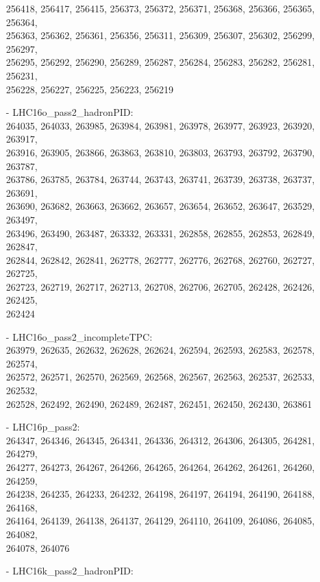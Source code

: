 \begin{appendix}
\begin{itemize}
     256418, 256417, 256415, 256373, 256372, 256371, 256368, 256366, 256365, 256364,\\
     256363, 256362, 256361, 256356, 256311, 256309, 256307, 256302, 256299, 256297,\\
     256295, 256292, 256290, 256289, 256287, 256284, 256283, 256282, 256281, 256231,\\
     256228, 256227, 256225, 256223, 256219
    \item[-] LHC16o\_pass2\_hadronPID:\\[1pt]
     264035, 264033, 263985, 263984, 263981, 263978, 263977, 263923, 263920, 263917,\\
     263916, 263905, 263866, 263863, 263810, 263803, 263793, 263792, 263790, 263787,\\
     263786, 263785, 263784, 263744, 263743, 263741, 263739, 263738, 263737, 263691,\\
     263690, 263682, 263663, 263662, 263657, 263654, 263652, 263647, 263529, 263497,\\
     263496, 263490, 263487, 263332, 263331, 262858, 262855, 262853, 262849, 262847,\\
     262844, 262842, 262841, 262778, 262777, 262776, 262768, 262760, 262727, 262725,\\
     262723, 262719, 262717, 262713, 262708, 262706, 262705, 262428, 262426, 262425,\\
     262424
    \item[-] LHC16o\_pass2\_incompleteTPC:\\[1pt]
     263979, 262635, 262632, 262628, 262624, 262594, 262593, 262583, 262578, 262574,\\
     262572, 262571, 262570, 262569, 262568, 262567, 262563, 262537, 262533, 262532,\\
     262528, 262492, 262490, 262489, 262487, 262451, 262450, 262430, 263861
    \item[-] LHC16p\_pass2:\\[1pt]
     264347, 264346, 264345, 264341, 264336, 264312, 264306, 264305, 264281, 264279,\\
     264277, 264273, 264267, 264266, 264265, 264264, 264262, 264261, 264260, 264259,\\
     264238, 264235, 264233, 264232, 264198, 264197, 264194, 264190, 264188, 264168,\\
     264164, 264139, 264138, 264137, 264129, 264110, 264109, 264086, 264085, 264082,\\
     264078, 264076
    \item[-] LHC16k\_pass2\_hadronPID:\\[1pt]

\end{itemize}
\end{appendix}
